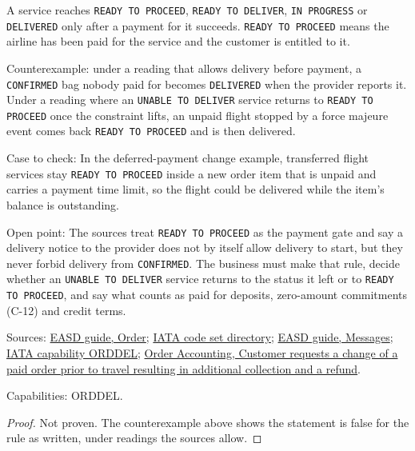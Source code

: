 \begin{theorem}
  \label{thm:delivery-paid-before-delivery}
  A service reaches \texttt{READY TO PROCEED}, \texttt{READY TO DELIVER},
  \texttt{IN PROGRESS} or \texttt{DELIVERED} only after a payment for it
  succeeds.  \texttt{READY TO PROCEED} means the airline has been paid for
  the service and the customer is entitled to it.

  Counterexample: under a reading that allows delivery before payment, a
  \texttt{CONFIRMED} bag nobody paid for becomes \texttt{DELIVERED} when the
  provider reports it.  Under a reading where an \texttt{UNABLE TO DELIVER}
  service returns to \texttt{READY TO PROCEED} once the constraint lifts, an
  unpaid flight stopped by a force majeure event comes back
  \texttt{READY TO PROCEED} and is then delivered.

  Case to check: In the deferred-payment change example, transferred flight
  services stay \texttt{READY TO PROCEED} inside a new order item that is
  unpaid and carries a payment time limit, so the flight could be delivered
  while the item's balance is outstanding.

  Open point: The sources treat \texttt{READY TO PROCEED} as the payment
  gate and say a delivery notice to the provider does not by itself allow
  delivery to start, but they never forbid delivery from \texttt{CONFIRMED}.
  The business must make that rule, decide whether an
  \texttt{UNABLE TO DELIVER} service returns to the status it left or to
  \texttt{READY TO PROCEED}, and say what counts as paid for deposits,
  zero-amount commitments (C-12) and credit terms.

  Sources: \href{https://standards.atlassian.net/wiki/spaces/EASD/pages/574849062/Order}{EASD guide, Order};
  \href{https://standards.atlassian.net/wiki/spaces/AIDM/pages/607420437/View+IATA+Codeset+Directory}{IATA code set directory};
  \href{https://standards.atlassian.net/wiki/spaces/EASD/pages/574652427/Messages}{EASD guide, Messages};
  \href{https://retailing.iata.org/armi/docs/ORDDEL/}{IATA capability ORDDEL};
  \href{https://standards.atlassian.net/wiki/spaces/OA/pages/844202130}{Order Accounting, Customer requests a change of a paid order prior to travel resulting in additional collection and a refund}.

  Capabilities: ORDDEL.
\end{theorem}
\begin{proof}
  Not proven.  The counterexample above shows the statement is false for
  the rule as written, under readings the sources allow.
\end{proof}

